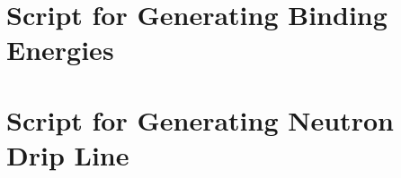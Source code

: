 \documentclass[11pt]{article} %
\begin{document}
\section{Script for Generating Binding Energies}


\newpage
\section{Script for Generating Neutron Drip Line}

\end{document}
